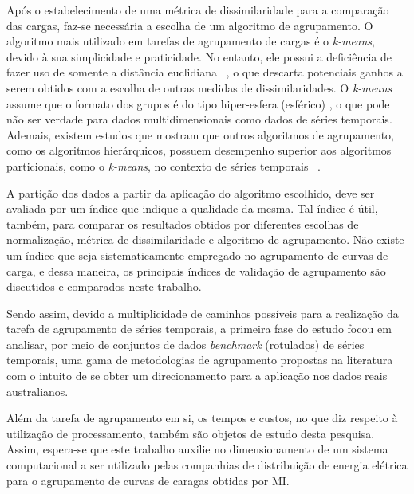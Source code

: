 Após o estabelecimento de uma métrica de dissimilaridade para a comparação das cargas, faz-se necessária a escolha de um algoritmo de agrupamento. O algoritmo mais utilizado em tarefas de agrupamento de cargas é o \emph{k-means}, devido à sua simplicidade e praticidade. No entanto, ele possui a deficiência de fazer uso de somente a distância euclidiana ~\parencite[][254]{Ullman}, o que descarta potenciais ganhos a serem obtidos com a escolha de outras medidas de dissimilaridades. O \emph{k-means} assume que o formato dos grupos é do tipo hiper-esfera (esférico) , o que pode não ser verdade para dados multidimensionais como dados de séries temporais. Ademais, existem estudos que mostram que outros algoritmos de agrupamento, como os algoritmos hierárquicos, possuem desempenho superior aos algoritmos particionais, como o \emph{k-means}, no contexto de séries temporais ~\parencite{k_shape}.

A partição dos dados a partir da aplicação do algoritmo escolhido, deve ser avaliada por um índice que indique a qualidade da mesma. Tal índice é útil, também, para comparar os resultados obtidos por diferentes escolhas de normalização, métrica de dissimilaridade e algoritmo de agrupamento. Não existe um índice que seja sistematicamente empregado no agrupamento de curvas de carga, e dessa maneira, os principais índices de validação de agrupamento são discutidos e comparados neste trabalho.

Sendo assim, devido a multiplicidade de caminhos possíveis para a realização da tarefa de agrupamento de séries temporais, a primeira fase do estudo focou em analisar, por meio de conjuntos de dados \emph{benchmark} (rotulados) de séries temporais, uma gama de metodologias de agrupamento propostas na literatura com o intuito de se obter um direcionamento para a aplicação nos dados reais australianos.

Além da tarefa de agrupamento em si, os tempos e custos, no que diz respeito à utilização de processamento, também são objetos de estudo desta pesquisa. Assim, espera-se que este trabalho auxilie no dimensionamento de um sistema computacional a ser utilizado pelas companhias de distribuição de energia elétrica para o agrupamento de curvas de caragas obtidas por MI.


